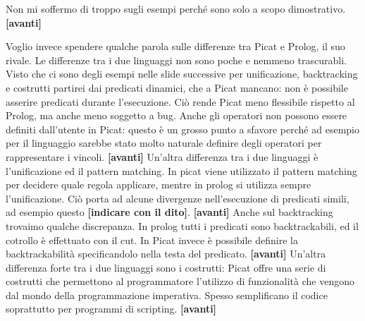 \documentclass[11pt]{article}
\newcommand*{\nextslide}{\textbf{[avanti]}}
\newcommand*{\fingerpointer}{\textbf{[indicare con il dito]}}
\begin{document}
Non mi soffermo di troppo sugli esempi perché sono solo a scopo
dimostrativo. \nextslide{}

Voglio invece spendere qualche parola sulle differenze tra Picat e
Prolog, il suo rivale. Le differenze tra i due linguaggi non sono
poche e nemmeno trascurabli. Visto che ci sono degli esempi nelle
slide successive per unificazione, backtracking e costrutti partirei
dai predicati dinamici, che a Picat mancano: non è possibile asserire
predicati durante l'esecuzione. Ciò rende Picat meno flessibile
rispetto al Prolog, ma anche meno soggetto a bug. Anche gli operatori
non possono essere definiti dall'utente in Picat: questo è un grosso
punto a sfavore perché ad esempio per il linguaggio \lset{} sarebbe
stato molto naturale definire degli operatori per rappresentare i
vincoli. \nextslide{} Un'altra differenza tra i due linguaggi è
l'unificazione ed il pattern matching. In picat viene utilizzato il
pattern matching per decidere quale regola applicare, mentre in prolog
si utilizza sempre l'unificazione. Ciò porta ad alcune divergenze
nell'esecuzione di predicati simili, ad esempio questo
\fingerpointer{}. \nextslide{} Anche sul backtracking trovaimo qualche
discrepanza. In prolog tutti i predicati sono backtrackabili, ed il
cotrollo è effettuato con il cut. In Picat invece è possibile definire
la backtrackabilità specificandolo nella testa del
predicato. \nextslide{} Un'altra differenza forte tra i due linguaggi
sono i costrutti: Picat offre una serie di costrutti che permettono al
programmatore l'utilizzo di funzionalità che vengono dal mondo della
programmazione imperativa. Spesso semplificano il codice soprattutto
per programmi di scripting. \nextslide{}
\end{document}
